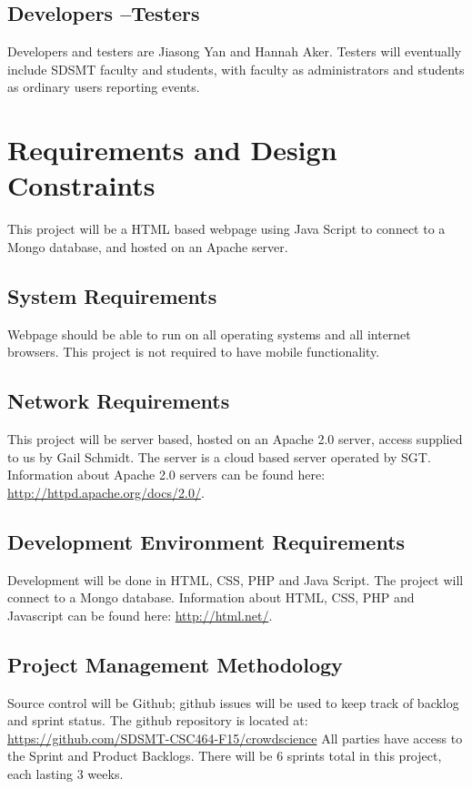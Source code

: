 \subsection{Developers --Testers}
Developers and testers are Jiasong Yan and Hannah Aker. Testers will eventually include SDSMT faculty and students, with faculty as administrators and students as ordinary users reporting events.

\section{Requirements and Design Constraints}

This project will be a HTML based webpage using Java Script to connect to a Mongo database, and hosted on an Apache server.

\subsection{System  Requirements}
Webpage should be able to run on all operating systems and all internet browsers. This project is not required to have mobile functionality.

\subsection{Network Requirements}
This project will be server based, hosted on an Apache 2.0 server, access supplied to us by Gail Schmidt. The server is a cloud based server operated by SGT. Information about Apache 2.0 servers can be found here: \url{http://httpd.apache.org/docs/2.0/}.

\subsection{Development Environment Requirements}
Development will be done in HTML, CSS, PHP and Java Script. The project will connect to a Mongo database. Information about HTML, CSS, PHP and Javascript can be found here: \url{http://html.net/}.

\subsection{Project  Management Methodology}
Source control will be Github; github issues will be used to keep track of backlog and sprint status. The github repository is located at: \url{https://github.com/SDSMT-CSC464-F15/crowdscience} All parties have access to the Sprint and Product Backlogs. There will be 6 sprints total in this project, each lasting 3 weeks.


